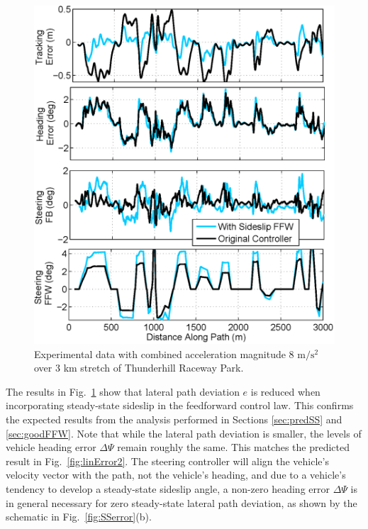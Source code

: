 \documentclass{nVSD2e}
\theoremstyle{plain}
\theoremstyle{definition}
\theoremstyle{remark}
\begin{document}
 
\begin{figure}[h]
\centering
\includegraphics[width=\columnwidth]{figures/betaCompensation.eps}
\caption{Experimental data with combined acceleration magnitude 8 $\mathrm{m/s^2}$ over 3 km stretch of Thunderhill Raceway Park.}
\label{fig:betaComparison}
\end{figure}


The results in Fig.~\ref{fig:betaComparison} show that lateral path deviation $e$ is reduced when incorporating 
steady-state sideslip in the feedforward control law. This confirms the expected results from the analysis performed in Sections \ref{sec:predSS}
and \ref{sec:goodFFW}. Note that while the lateral path deviation is smaller, the levels of vehicle heading error $\Delta\Psi$ remain roughly the
same. This matches the predicted result in Fig.~\ref{fig:linError2}. The steering controller will align the vehicle's
velocity vector with the path, not the vehicle's heading, and due to a vehicle's tendency to develop a steady-state sideslip angle,
 a non-zero heading error $\Delta\Psi$ is in general necessary for zero steady-state lateral path deviation,
 as shown by the schematic in Fig.~\ref{fig:SSerror}(b).
\end{document}
